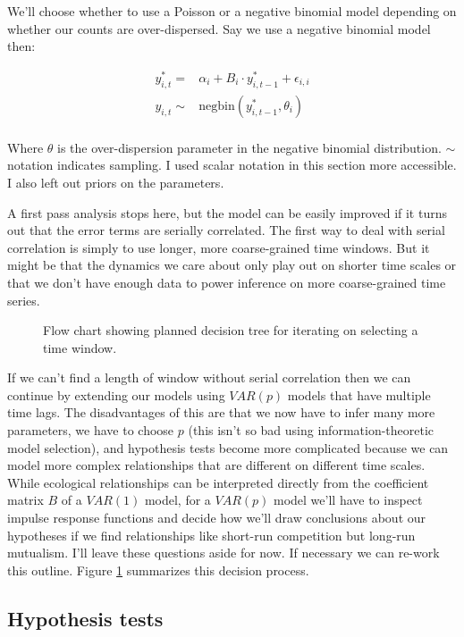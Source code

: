\documentclass[12pt]{memoir}
\begin{document}
We'll choose whether to use a Poisson or a negative binomial model depending on whether our counts are over-dispersed.  Say we use a negative binomial model then:

\begin{align*}
  y^*_{i,t} = & \alpha_i + B_i \cdot y^*_{i,t-1} + \epsilon_{i,i}\\
  y_{i,t} \sim & \mathrm{negbin}(y^*_{i,t-1}, \theta_{i}) \\
\end{align*}

Where $\theta$ is the over-dispersion parameter in the negative binomial distribution.  $\sim$ notation indicates sampling. I used scalar notation in this section more accessible.  I also left out priors on the parameters.

A first pass analysis stops here, but the model can be easily improved if it turns out that the error terms are serially correlated.  The first way to deal with serial correlation is simply to use longer, more coarse-grained time windows. But it might be that the dynamics we care about only play out on shorter time scales or that we don't have enough data to power inference on more coarse-grained time series.

\begin{figure}[t]
  
  \caption{Flow chart showing planned decision tree for iterating on selecting a time window. \label{fig:analytic_plan}}
\end{figure}

If we can't find a length of window without serial correlation then we can continue by extending our models using $VAR(p)$ models that have multiple time lags. The disadvantages of this are that we now have to infer many more parameters, we have to choose $p$ (this isn't so bad using information-theoretic model selection), and hypothesis tests become more complicated because we can model more complex relationships that are different on different time scales. While ecological relationships can be interpreted directly from the coefficient matrix $B$ of a $VAR(1)$ model, for a $VAR(p)$ model we'll have to inspect impulse response functions and decide how we'll draw conclusions about our hypotheses if we find relationships like short-run competition but long-run mutualism.  I'll leave these questions aside for now.  If necessary we can re-work this outline. Figure \ref{fig:analytic_plan} summarizes this decision process.

\subsection{Hypothesis tests}
\label{sec:hypothesis_tests}
\end{document}
